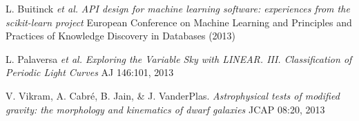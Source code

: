 \documentclass{article} %
\def\sl{\slshape}
\begin{document}
{\begin{itemize}[leftmargin=0ex, itemsep=0ex, parsep=.5ex, labelindent=-4ex]
    \publication
      L. Buitinck {\it et al.}
      {\it API design for machine learning software:
        experiences from the scikit-learn project}
      European Conference on Machine Learning and Principles and Practices
      of Knowledge Discovery in Databases (2013)

    \publication
      L. Palaversa {\sl et al.}
      {\sl Exploring the Variable Sky with LINEAR. III.
        Classification of Periodic Light Curves}
      AJ 146:101, 2013

    \publication
      V. Vikram, A. Cabr\'{e}, B. Jain, \& J. VanderPlas.
      {\it Astrophysical tests of modified gravity:
        the morphology and kinematics of dwarf galaxies}
      JCAP 08:20, 2013

  \end{itemize}
}
\end{document}
